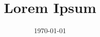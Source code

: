 \documentclass[a4paper,landscape,8pt]{extarticle}
\title{Lorem Ipsum}
\date{\today}
\begin{document}
\setlength{\belowdisplayskip}{4pt} \setlength{\belowdisplayshortskip}{4pt}
\setlength{\abovedisplayskip}{4pt} \setlength{\abovedisplayshortskip}{4pt}

\graphicspath{ {./img/} }

\allowdisplaybreaks

\begin{multicols*}{4}
\raggedcolumns

\maketitle

\setcounter{tocdepth}{2}




\end{multicols*}
\end{document}
